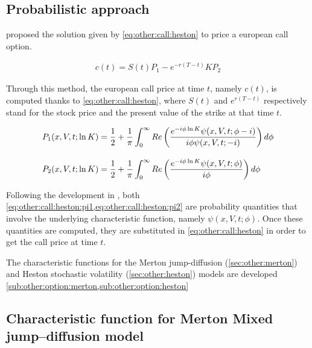 \documentclass[12pt,a4paper]{report}
\begin{document}
\subsection{Probabilistic approach}
\label{sub:other:option:probabilistic}

\citet{heston1993} proposed the solution given by \cref{eq:other:call:heston} to price a european call option.

\begin{align}
  c(t) = S(t) P_1 - e^{-r(T-t)} K P_2 \label{eq:other:call:heston}
\end{align}

Through this method, the european call price at time $t$, namely $c(t)$, is computed thanks to \cref{eq:other:call:heston}, where $S(t)$ and $e^{r(T - t)}$ respectively stand for the stock price and the present value of the strike at that time $t$.

\begin{align}
  P_1(x,V,t;\ln{K}) &= \frac{1}{2} + \frac{1}{\pi} \int_0^{\infty} Re \left( \frac{e^{-i\phi\ln{K}} \psi(x,V,t;\phi - i)}{i\phi\psi(x,V,t;-i)} \right) d\phi \label{eq:other:call:heston:pi1} \\ 
  \intertext{}
  P_2(x,V,t;\ln{K}) &= \frac{1}{2} + \frac{1}{\pi} \int_0^{\infty} Re \left( \frac{e^{-i\phi\ln{K}} \psi(x,V,t;\phi)}{i\phi} \right) d\phi \label{eq:other:call:heston:pi2}
\end{align}

Following the development in \citet{criso2015}, both \cref{eq:other:call:heston:pi1,eq:other:call:heston:pi2} are probability quantities that involve the underlying characteristic function, namely $\psi(x,V,t;\phi)$. Once these quantities are computed, they are substituted in \cref{eq:other:call:heston} in order to get the call price at time $t$.

The characteristic functions for the Merton jump-diffusion (\cref{sec:other:merton}) and Heston stochastic volatility (\cref{sec:other:heston}) models are developed \cref{sub:other:option:merton,sub:other:option:heston}



\subsection{Characteristic function for Merton Mixed jump--diffusion model}
\label{sub:other:option:merton}
\end{document}
